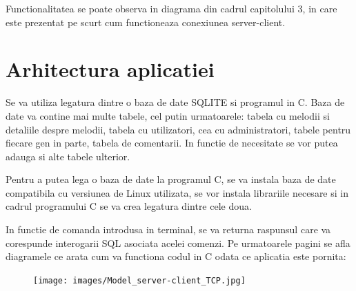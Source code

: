 \documentclass[a4paper]{article}
\begin{document}
Functionalitatea se poate observa in diagrama din cadrul capitolului 3, in care este prezentat pe scurt cum functioneaza conexiunea server-client.

\section{Arhitectura aplicatiei}

\quad Se va utiliza legatura dintre o baza de date SQLITE si programul in C. Baza de date va contine mai multe tabele, cel putin urmatoarele: tabela cu melodii si detaliile despre melodii, tabela cu utilizatori, cea cu administratori, tabele pentru fiecare gen in parte, tabela de comentarii. In functie de necesitate se vor putea adauga si alte tabele ulterior. 

Pentru a putea lega o baza de date la programul C, se va instala baza de date compatibila cu versiunea de Linux utilizata, se vor instala librariile necesare si in cadrul programului C se va crea legatura dintre cele doua.

In functie de comanda introdusa in terminal, se va returna raspunsul care va corespunde interogarii SQL asociata acelei comenzi. Pe urmatoarele pagini se afla diagramele ce arata cum va functiona codul in C odata ce aplicatia este pornita: 

\newpage

\vspace*{\fill}
\begingroup

\begin{figure}[H]
\centering
\texttt{[image: images/Model\_server-client\_TCP.jpg]}
\end{figure}
\end{document}
